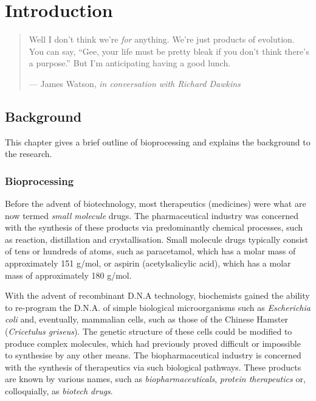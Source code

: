 %
%
%
%

\chapter{Introduction}\label{C.intro}

\begin{quote}
Well I don't think we're \emph{for} anything. We're just products of evolution.
You can say, ``Gee, your life must be pretty bleak if you don't think there's a
purpose.'' But I'm anticipating having a good lunch.

\hspace{2cm}--- James Watson, \emph{in conversation with Richard Dawkins}
\end{quote}


\section{Background}\label{S.intro1}

This chapter gives a brief outline of bioprocessing and explains the background
to the research.

\subsection{Bioprocessing}\label{SS.bioproc}

Before the advent of biotechnology, most therapeutics (medicines) were what are
now termed \emph{small molecule} drugs. The pharmaceutical industry was
concerned with the synthesis of these products via predominantly chemical
processes, such as reaction, distillation and  crystallisation.  Small molecule
drugs typically consist of tens or hundreds of atoms, such as paracetamol, which
has a molar mass of approximately 151 g/mol, or aspirin (acetylsalicylic acid),
which has a molar mass of approximately 180 g/mol.

With the advent of recombinant D.N.A technology, biochemists gained
the ability to re-program the D.N.A. of simple biological microorganisms such as
\textit{Escherichia coli} and, eventually, mammalian cells, such as those of the
Chinese Hamster (\textit{Cricetulus griseus}).  The genetic structure of these
cells could be modified to produce complex molecules, which had previously
proved difficult or impossible to synthesise by any other means.  The
biopharmaceutical industry is concerned with the synthesis of therapeutics via
such biological pathways.  These products are known by various names, such as
\emph{biopharmaceuticals}, \emph{protein therapeutics} or, colloquially, as
\emph{biotech drugs}.

